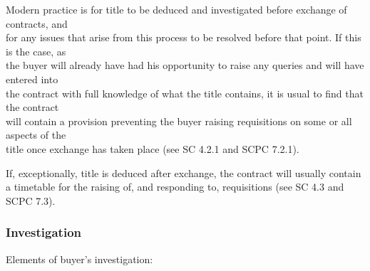 \documentclass[
]{article}
\begin{document}
Modern practice is for title to be deduced and investigated before
exchange of contracts, and\\
for any issues that arise from this process to be resolved before that
point. If this is the case, as\\
the buyer will already have had his opportunity to raise any queries and
will have entered into\\
the contract with full knowledge of what the title contains, it is usual
to find that the contract\\
will contain a provision preventing the buyer raising requisitions on
some or all aspects of the\\
title once exchange has taken place (see SC 4.2.1 and SCPC 7.2.1).

If, exceptionally, title is deduced after exchange, the contract will
usually contain a timetable for the raising of, and responding to,
requisitions (see SC 4.3 and SCPC 7.3).

\hypertarget{investigation}{%
\subsubsection{Investigation}\label{investigation}}

Elements of buyer's investigation:
\end{document}
